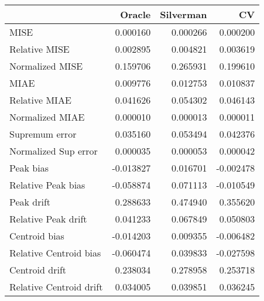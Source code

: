 \begin{tabular}{lrrr}
  \toprule
 & Oracle & Silverman & CV \\ 
  \midrule
MISE & 0.000160 & 0.000266 & 0.000200 \\ 
  Relative MISE & 0.002895 & 0.004821 & 0.003619 \\ 
  Normalized MISE & 0.159706 & 0.265931 & 0.199610 \\ 
  MIAE & 0.009776 & 0.012753 & 0.010837 \\ 
  Relative MIAE & 0.041626 & 0.054302 & 0.046143 \\ 
  Normalized MIAE & 0.000010 & 0.000013 & 0.000011 \\ 
  Supremum error & 0.035160 & 0.053494 & 0.042376 \\ 
  Normalized Sup error & 0.000035 & 0.000053 & 0.000042 \\ 
  Peak bias & -0.013827 & 0.016701 & -0.002478 \\ 
  Relative Peak bias & -0.058874 & 0.071113 & -0.010549 \\ 
  Peak drift & 0.288633 & 0.474940 & 0.355620 \\ 
  Relative Peak drift & 0.041233 & 0.067849 & 0.050803 \\ 
  Centroid bias & -0.014203 & 0.009355 & -0.006482 \\ 
  Relative Centroid bias & -0.060474 & 0.039833 & -0.027598 \\ 
  Centroid drift & 0.238034 & 0.278958 & 0.253718 \\ 
  Relative Centroid drift & 0.034005 & 0.039851 & 0.036245 \\ 
   \bottomrule
\end{tabular}
